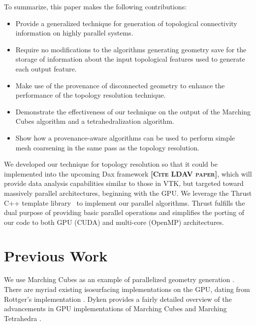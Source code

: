 \documentclass[10pt,journal,cspaper,compsoc]{IEEEtran}
\newcommand{\fix}[1]{{\color{red}\textbf{\textsc{[#1]}}}}
\begin{document}
\noindent
\begin{minipage}{\linewidth}
To summarize, this paper makes the following contributions:
\begin{itemize}
	\item{Provide a generalized technique for generation of topological connectivity information on highly parallel systems.}
	\item{Require no modifications to the algorithms generating geometry save for the
		storage of information about the input topological features used to generate each output feature.}

	\item{Make use of the provenance of disconnected geometry to enhance the performance of the topology
		resolution technique.}

	\item{Demonstrate the effectiveness of our technique on the output of the Marching Cubes
		algorithm and a tetrahedralization algorithm.}
 
	\item{Show how a provenance-aware algorithms can be used to perform
		 simple mesh coarsening in the same pass as the topology resolution.}
 
\end{itemize}
\vspace{5mm}
\end{minipage}

We developed our technique for topology resolution so that it could be implemented
into the upcoming Dax framework \fix{Cite LDAV paper}, which will provide data analysis capabilities similar to those
in VTK, but targeted toward massively parallel architectures, beginning with the GPU.
We leverage the Thrust C++ template library~\cite{Bell2012} to implement
our parallel algorithms.  Thrust fulfills the dual purpose of providing
basic parallel operations and simplifies the porting of our code to both
GPU (CUDA) and multi-core (OpenMP) architectures.

\section{Previous Work}
\label{sec:PreviousWork}

We use Marching Cubes as an example of parallelized geometry 
generation \cite{Lorensen1987}. There are myriad existing isosurfacing implementations on the GPU, dating from 
Rottger's implementation \cite{Rottger2000}. Dyken provides a fairly 
detailed overview of the advancements in GPU implementations of Marching Cubes and 
Marching Tetrahedra \cite{Dyken2008}.
\end{document}
